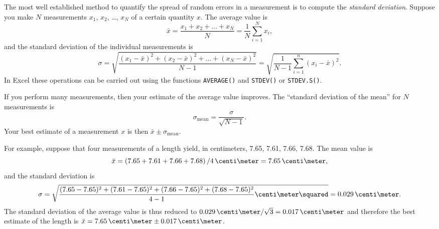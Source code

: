 
The most well established method to quantify the spread of random errors in a measurement is to compute the {\it standard deviation}. Suppose you make $N$ measurements $x_1$, $x_2$, \ldots, $x_N$ of a certain quantity $x$. The average value is
\begin{equation}
  \label{eq:errorMeanX}
  \bar{x}=\frac{x_1 + x_2 + \ldots + x_N}{N}=\frac{1}{N}\sum_{i=1}^N x_{i},
\end{equation}
and the standard deviation of the individual measurements is
\begin{equation}
  \label{eq:errorSigmaX}
  \sigma = \sqrt{\frac{(x_1-\bar{x})^2 + (x_2-\bar{x})^2 + \ldots + (x_N-\bar{x})^2}{N-1}} = \sqrt{\frac{1}{N-1} \sum_{i=1}^{n}\left(x_i-\bar{x}\right)^2}.
\end{equation}
In Excel these operations can be carried out using the functions \texttt{AVERAGE()} and \texttt{STDEV()} or \texttt{STDEV.S()}.

If you perform many measurements, then your estimate of the average value improves. The ``standard deviation of the mean'' for $N$ measurements is
\begin{equation}
  \label{eq:errorSigmaMeanX}
  \sigma_{\mbox{mean}} = \frac{\sigma}{\sqrt{N-1}}.
\end{equation}
Your best estimate of a measurement $x$ is then $\bar{x} \pm \sigma_{\mbox{mean}}$.

For example, suppose that four measurements of a length yield, in centimeters, 7.65, 7.61, 7.66, 7.68.  The mean value is
\[
\bar{x} = \left(7.65 + 7.61 + 7.66 + 7.68\right)/4\,\centi\meter
        = 7.65\,\centi\meter,
\]
and the standard deviation is
\[
\sigma = \sqrt{\frac{(7.65-7.65)^2 + (7.61-7.65)^2 + 
                     (7.66-7.65)^2 + (7.68-7.65)^2}{4-1}\centi\meter\squared}
       = 0.029\,\centi\meter.
\]
The standard deviation of the average value is thus reduced to $ 0.029\,\centi\meter / \sqrt{3} =  0.017\,\centi\meter $ and therefore the best estimate of the length is $\bar{x} =  7.65\,\centi\meter \pm 0.017\,\centi\meter$.

